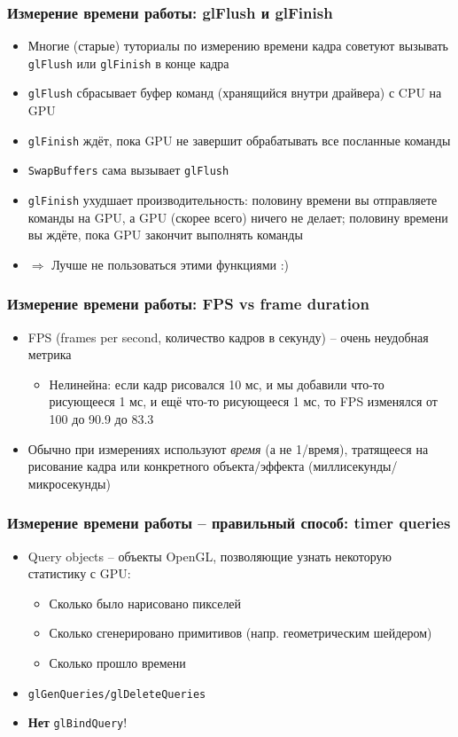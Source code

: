 \documentclass{beamer}
\begin{document}
\begin{frame}[fragile]
\frametitle{Измерение времени работы: glFlush и glFinish}
\begin{itemize}
\item Многие (старые) туториалы по измерению времени кадра советуют вызывать \verb|glFlush| или \verb|glFinish| в конце кадра
\pause
\item \verb|glFlush| сбрасывает буфер команд (хранящийся внутри драйвера) с CPU на GPU
\pause
\item \verb|glFinish| ждёт, пока GPU не завершит обрабатывать все посланные команды
\pause
\item \verb|SwapBuffers| сама вызывает \verb|glFlush|
\pause
\item \verb|glFinish| ухудшает производительность: половину времени вы отправляете команды на GPU, а GPU (скорее всего) ничего не делает; половину времени вы ждёте, пока GPU закончит выполнять команды
\pause
\item \begin{math}\Rightarrow\end{math} Лучше не пользоваться этими функциями :)
\end{itemize}
\end{frame}

\begin{frame}[fragile]
\frametitle{Измерение времени работы: FPS vs frame duration}
\begin{itemize}
\item FPS (frames per second, количество кадров в секунду) -- очень неудобная метрика
\pause
\begin{itemize}
\item Нелинейна: если кадр рисовался 10 мс, и мы добавили что-то рисующееся 1 мс, и ещё что-то рисующееся 1 мс, то FPS изменялся от 100 до 90.9 до 83.3
\end{itemize}
\pause
\item Обычно при измерениях используют \textit{время} (а не 1/время), тратящееся на рисование кадра или конкретного объекта/эффекта (миллисекунды/микросекунды)
\end{itemize}
\end{frame}

\begin{frame}[fragile]
\frametitle{Измерение времени работы -- правильный способ: timer queries}
\begin{itemize}
\item Query objects -- объекты OpenGL, позволяющие узнать некоторую статистику с GPU:
\pause
\begin{itemize}
\item Сколько было нарисовано пикселей
\pause
\item Сколько сгенерировано примитивов (напр. геометрическим шейдером)
\pause
\item Сколько прошло времени
\end{itemize}
\pause
\item \verb|glGenQueries/glDeleteQueries|
\pause
\item \textbf{Нет} \verb|glBindQuery|!
\end{itemize}
\end{frame}
\end{document}
